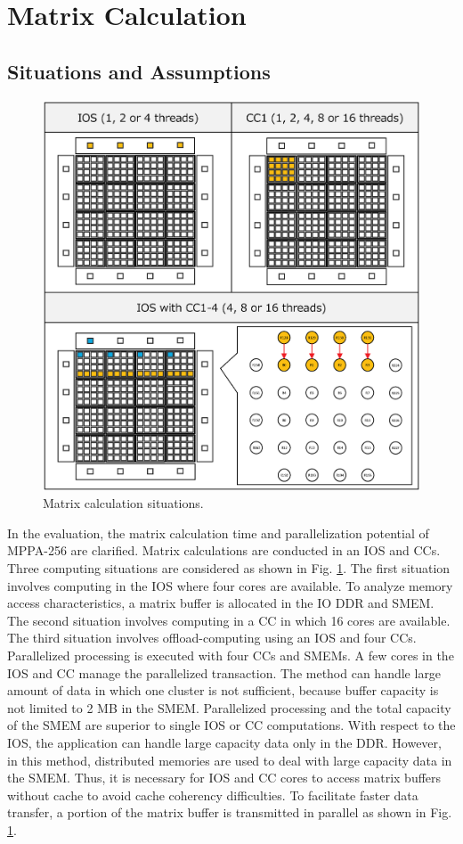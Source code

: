 \clearpage

\section{Matrix Calculation}
\label{sec:martix_eval}

\subsection{Situations and Assumptions}
\label{sec:situations_and_assumptions1}

\begin{figure}[!htbp]
  \centering
  \includegraphics[width=0.5\linewidth]{../figure/matrix_calculation.eps}
  \caption{\label{fig:mat_calc}
    Matrix calculation situations.}
\end{figure}

In the evaluation, the matrix calculation time and parallelization potential of MPPA-256 are clarified.
Matrix calculations are conducted in an IOS and CCs.
Three computing situations are considered as shown in Fig. \ref{fig:mat_calc}.
The first situation involves computing in the IOS where four cores are available.
To analyze memory access characteristics, a matrix buffer is allocated in the IO DDR and SMEM.
The second situation involves computing in a CC in which 16 cores are available.
The third situation involves offload-computing using an IOS and four CCs.
Parallelized processing is executed with four CCs and SMEMs.
A few cores in the IOS and CC manage the parallelized transaction.
The method can handle large amount of data in which one cluster is not sufficient, because buffer capacity is not limited to 2 MB in the SMEM.
Parallelized processing and the total capacity of the SMEM are superior to single IOS or CC computations. 
With respect to the IOS, the application can handle large capacity data only in the DDR.
However, in this method, distributed memories are used to deal with large capacity data in the SMEM.
Thus, it is necessary for IOS and CC cores to access matrix buffers without cache to avoid cache coherency difficulties.
To facilitate faster data transfer, a portion of the matrix buffer is transmitted in parallel as shown in Fig. \ref{fig:mat_calc}.

